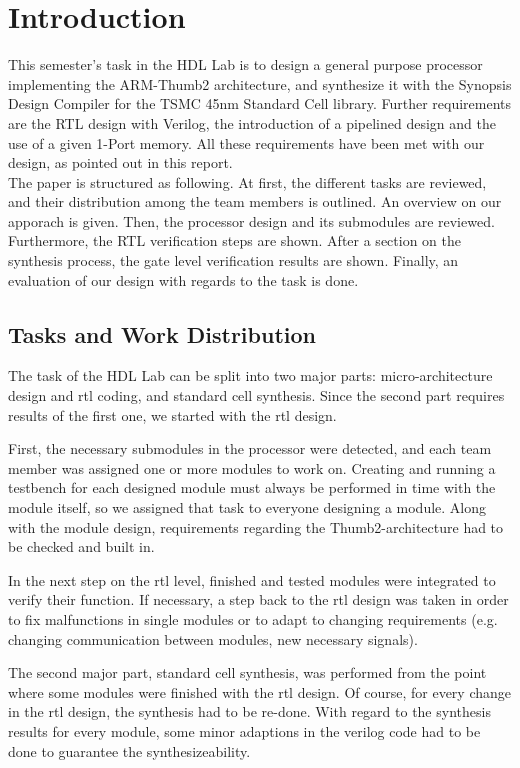 \chapter{Introduction}
\label{cha:introduction}

This semester's task in the HDL Lab is to design a general purpose processor implementing the ARM-Thumb2 architecture, and synthesize it with the Synopsis Design Compiler for the TSMC 45nm Standard Cell library. Further requirements are the RTL design with Verilog, the introduction of a pipelined design and the use of a given 1-Port memory. All these requirements have been met with our design, as pointed out in this report.\\ The paper is structured as following. At first, the different tasks are reviewed, and their distribution among the team members is outlined. An overview on our apporach is given. Then, the processor design and its submodules are reviewed. Furthermore, the RTL verification steps are shown. After a section on the synthesis process, the gate level verification results are shown. Finally, an evaluation of our design with regards to the task is done.

\section{Tasks and Work Distribution}
\label{sec:tasksandworkdistribution}

The task of the HDL Lab can be split into two major parts: micro-architecture design and rtl coding, and standard cell synthesis. Since the second part requires results of the first one, we started with the rtl design. 

First, the necessary submodules in the processor were detected, and each team member was assigned one or more modules to work on. Creating and running a testbench for each designed module must always be performed in time with the module itself, so we assigned that task to everyone designing a module. Along with the module design, requirements regarding the Thumb2-architecture had to be checked and built in. 

In the next step on the rtl level, finished and tested modules were integrated to verify their function. If necessary, a step back to the rtl design was taken in order to fix malfunctions in single modules or to adapt to changing requirements (e.g. changing communication between modules, new necessary signals).

The second major part, standard cell synthesis, was performed from the point where some modules were finished with the rtl design. Of course, for every change in the rtl design, the synthesis had to be re-done. With regard to the synthesis results for every module, some minor adaptions in the verilog code had to be done to guarantee the synthesizeability.

